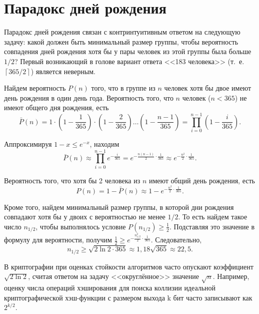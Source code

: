 \section{Парадокс дней рождения}\label{section-birthday-padradox}

Парадокс дней рождения связан с контринтуитивным ответом на следующую задачу: какой должен быть минимальный размер группы, чтобы вероятность совпадения дней рождения хотя бы у пары человек из этой группы была больше $1 / 2$? Первый возникающий в голове вариант ответа <<183 человека>> (т.~е. $\left\lceil 365 / 2 \right\rceil$) является неверным.

Найдем вероятность $P(n)$ того, что в группе из $n$ человек хотя бы двое имеют день рождения в один день года. Вероятность того, что $n$ человек ($n < 365$) не имеют общего дня рождения, есть
\[
    \bar{P}(n) = 1 \cdot \left( 1 - \frac{1}{365} \right) \cdot \left(1 - \frac{2}{365} \right)  \dots  \left( 1 - \frac{n-1}{365} \right) = \prod\limits_{i=0}^{n-1} \left( 1 - \frac{i}{365} \right).
\]

Аппроксимируя $1-x \leq e^{-x}$, находим
    \[ \bar{P}(n) \approx \prod\limits_{i=0}^{n-1} e^{-\frac{i}{365}} = e^{-\frac{n(n-1)}{2} \cdot \frac{1}{365}} \approx e^{-\frac{n^2}{2} \cdot \frac{1}{365}}. \]

Вероятность того, что хотя бы 2 человека из $n$ имеют общий день рождения, есть
    \[ P(n) = 1 - \bar{P}(n) \approx 1 -  e^{-\frac{n^2}{2} \cdot \frac{1}{365}}. \]

Кроме того, найдем минимальный размер группы, в которой дни рождения совпадают хотя бы у двоих с вероятностью не менее $1/2$. То есть найдем такое число $n_{1/2}$, чтобы выполнялось условие $P(n_{1/2}) \geq \frac{1}{2}$. Подставляя это значение в формулу для вероятности, получим $\frac{1}{2} \geq e^{-\frac{n_{1/2}^2}{2} \cdot \frac{1}{365}}$. Следовательно,
	\[n_{1/2} \geq \sqrt{2 \ln 2 \cdot 365} \approx 1,18 \sqrt{ 365 } \approx 22,5.\]
	
В криптографии при оценках стойкости алгоритмов часто опускают коэффициент $\sqrt{2 \ln 2}$, считая ответом на задачу <<округлённое>> значение $\sqrt{ n }$. Например, оценку числа операций хэширования для поиска коллизии идеальной криптографической хэш-функции с размером выхода k бит часто записывают как $2^{k/2}$.
